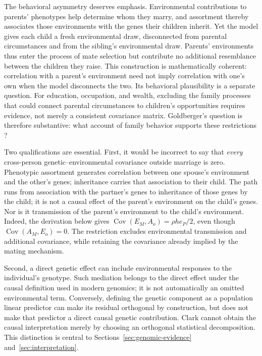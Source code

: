 The behavioral asymmetry deserves emphasis. Environmental contributions
to parents' phenotypes help determine whom they marry, and assortment
thereby associates those environments with the genes their children
inherit. Yet the model gives each child a fresh environmental draw,
disconnected from parental circumstances and from the sibling's
environmental draw. Parents' environments thus enter the process of mate
selection but contribute no additional resemblance between the children
they raise. This construction is mathematically coherent: correlation with
a parent's environment need not imply correlation with one's own when
the model disconnects the two. Its behavioral plausibility is a separate
question. For education, occupation, and wealth, excluding the family
processes that could connect parental circumstances to children's
opportunities requires evidence, not merely a consistent covariance matrix.
Goldberger's question is therefore substantive: what account of family
behavior supports these restrictions \citep[pp.~36--37]{Goldberger1978}?

Two qualifications are essential. First, it would be incorrect to say
that \emph{every} cross-person genetic--environmental covariance outside
marriage is zero. Phenotypic assortment generates correlation between one
spouse's environment and the other's genes; inheritance carries that
association to their child. The path runs from association with the
partner's genes to inheritance of those genes by the child; it is not a
causal effect of the parent's environment on the child's genes. Nor is it
transmission of the parent's environment to the child's environment.
Indeed, the derivation below gives
$\operatorname{Cov}(E_M,A_o)=\rho h e_P/2$, even though
$\operatorname{Cov}(A_M,E_o)=0$. The restriction excludes environmental
transmission and additional covariance, while retaining the covariance
already implied by the mating mechanism.

Second, a direct genetic effect can include environmental responses to
the individual's genotype. Such mediation belongs to the direct effect
under the causal definition used in modern genomics; it is not automatically
an omitted environmental term. Conversely, defining the genetic component
as a population linear predictor can make its residual orthogonal by
construction, but does not make that predictor a direct causal genetic
contribution. Clark cannot obtain the causal interpretation merely by
choosing an orthogonal statistical decomposition. This distinction is
central to Sections~\ref{sec:genomic-evidence} and~\ref{sec:interpretation}.

